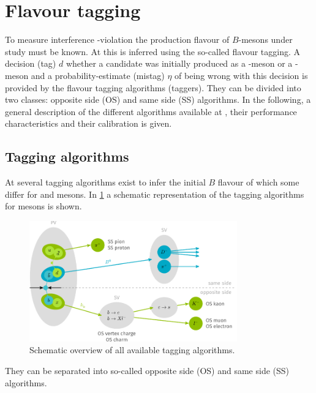 \section{Flavour tagging}
\label{sec:flavourtagging}

To measure interference \CP-violation the production flavour of $B$-mesons under study must be known.
At \lhcb this is inferred using the so-called flavour tagging.
A decision (tag) $d$ whether a \B candidate was initially produced as a \Bz-meson or a \Bzb-meson and a probability-estimate (mistag) $\eta$ of being wrong with this decision is provided by the flavour tagging algorithms (taggers).
They can be divided into two classes: opposite side (OS) and same side (SS) algorithms.
In the following, a general description of the different algorithms available at \lhcb, their performance characteristics and their calibration is given.

\subsection{Tagging algorithms}
\label{sec:taggingalgorithms}

At \lhcb several tagging algorithms exist to infer the initial $B$ flavour of which some differ for \Bz and \Bs mesons.
In \cref{fig:taggingalgorithms} a schematic representation of the tagging algorithms for \Bz mesons is shown.
\begin{figure}[tbp]
    \centering
    \includegraphics[width=0.8\textwidth]{09FlavourTagging/figs/FTscheme.pdf}
    \caption{Schematic overview of all available \Bz tagging algorithms.}
    \label{fig:taggingalgorithms}
\end{figure}
They can be separated into so-called opposite side (OS) and same side (SS) algorithms.


